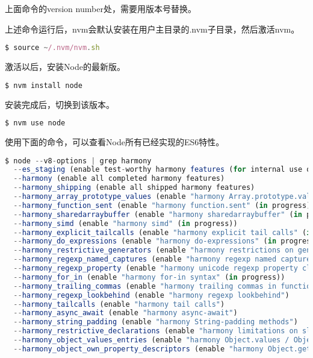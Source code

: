 上面命令的version number处，需要用版本号替换。

上述命令运行后，nvm会默认安装在用户主目录的.nvm子目录，然后激活nvm。



\begin{lstlisting}[language=JavaScript]
$ source ~/.nvm/nvm.sh
\end{lstlisting}

激活以后，安装Node的最新版。


\begin{lstlisting}[language=JavaScript]
$ nvm install node
\end{lstlisting}


安装完成后，切换到该版本。


\begin{lstlisting}[language=JavaScript]
$ nvm use node
\end{lstlisting}

使用下面的命令，可以查看Node所有已经实现的ES6特性。


\begin{lstlisting}[language=JavaScript]
$ node --v8-options | grep harmony
  --es_staging (enable test-worthy harmony features (for internal use only))
  --harmony (enable all completed harmony features)
  --harmony_shipping (enable all shipped harmony features)
  --harmony_array_prototype_values (enable "harmony Array.prototype.values" (in progress))
  --harmony_function_sent (enable "harmony function.sent" (in progress))
  --harmony_sharedarraybuffer (enable "harmony sharedarraybuffer" (in progress))
  --harmony_simd (enable "harmony simd" (in progress))
  --harmony_explicit_tailcalls (enable "harmony explicit tail calls" (in progress))
  --harmony_do_expressions (enable "harmony do-expressions" (in progress))
  --harmony_restrictive_generators (enable "harmony restrictions on generator declarations" (in progress))
  --harmony_regexp_named_captures (enable "harmony regexp named captures" (in progress))
  --harmony_regexp_property (enable "harmony unicode regexp property classes" (in progress))
  --harmony_for_in (enable "harmony for-in syntax" (in progress))
  --harmony_trailing_commas (enable "harmony trailing commas in function parameter lists" (in progress))
  --harmony_regexp_lookbehind (enable "harmony regexp lookbehind")
  --harmony_tailcalls (enable "harmony tail calls")
  --harmony_async_await (enable "harmony async-await")
  --harmony_string_padding (enable "harmony String-padding methods")
  --harmony_restrictive_declarations (enable "harmony limitations on sloppy mode function declarations")
  --harmony_object_values_entries (enable "harmony Object.values / Object.entries")
  --harmony_object_own_property_descriptors (enable "harmony Object.getOwnPropertyDescriptors()")
\end{lstlisting}

